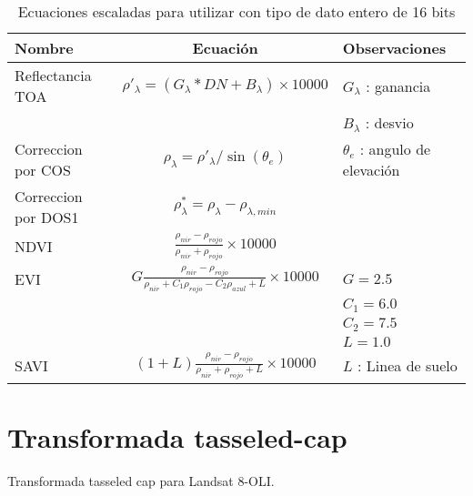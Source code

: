 \documentclass[hidelinks,12pt]{article}
\begin{document}
\begin{table}[hbt]
    \centering
    \begin{tabular}{lcl}
        \toprule
        Nombre & Ecuaci\'on & Observaciones\\
        \midrule
        Reflectancia TOA & $\rho'_\lambda =
        (G_\lambda*DN+B_\lambda)\times10000$ &
        $G_\lambda$ : ganancia\\
        & & $B_\lambda$ : desvio\\
        Correccion por COS & $\rho_\lambda = \rho'_\lambda /
        \sin(\theta_e)$ & $\theta_e$ : angulo de elevaci\'on \\
        Correccion por DOS1 & $\rho^*_\lambda = \rho_\lambda -
        \rho_{\lambda,min}$ & \\
        NDVI & $\displaystyle\frac{\rho_{nir} -
    \rho_{rojo}}{\rho_{nir}+\rho_{rojo}}\times10000$ & \\
        EVI & $\displaystyle G\frac{\rho_{nir} -
    \rho_{rojo}}{\rho_{nir}+C_1\rho_{rojo}-C_2\rho_{azul}+L}\times10000$ &
        $G=2.5$ \\
        & & $C_1=6.0$\\
        & & $C_2=7.5$\\
        & & $L = 1.0$\\
        SAVI & $\displaystyle(1+L)\frac{\rho_{nir} -
    \rho_{rojo}}{\rho_{nir}+\rho_{rojo}+L}\times10000$ & $L$ : Linea de suelo\\
        \bottomrule
    \end{tabular}
    \caption{Ecuaciones escaladas para utilizar con tipo de dato entero de 16
    bits}
\end{table}

\section{Transformada tasseled-cap}
Transformada tasseled cap para Landsat 8-OLI.
\end{document}
